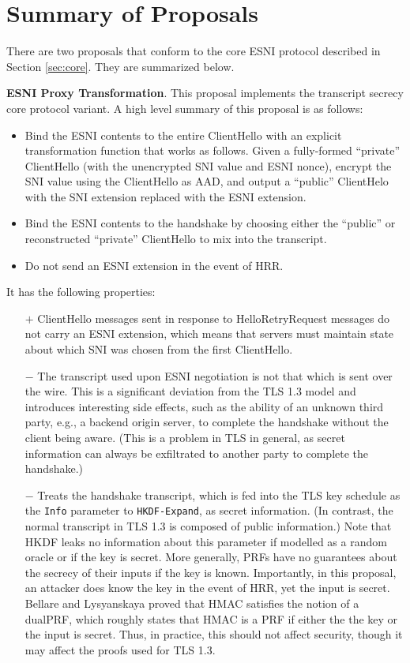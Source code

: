 \documentclass{article}
\theoremstyle{definition}
\theoremstyle{definition}
\begin{document}
\section{Summary of Proposals} \label{sec:proposals}

There are two proposals that conform to the core ESNI protocol described in Section \ref{sec:core}. 
They are summarized below.

\textbf{ESNI Proxy Transformation}. This proposal implements the transcript secrecy core protocol variant. 
A high level summary of this proposal is as follows:
%
\begin{itemize}
  \item Bind the ESNI contents to the entire ClientHello with an explicit transformation function
  that works as follows. Given a fully-formed ``private'' ClientHello (with the unencrypted SNI 
  value and ESNI nonce), encrypt the SNI value using the ClientHello as AAD, and output a ``public'' 
  ClientHelo with the SNI extension replaced with the ESNI extension. 
  \item Bind the ESNI contents to the handshake by choosing either the ``public'' or reconstructed
  ``private'' ClientHello to mix into the transcript. 
  \item Do not send an ESNI extension in the event of HRR.
\end{itemize}
%
It has the following properties:
%
\begin{itemize}
  \item[$+$] ClientHello messages sent in response to HelloRetryRequest messages do not carry an ESNI
  extension, which means that servers must maintain state about which SNI was chosen from the first ClientHello.
  \item[$-$] The transcript used upon ESNI negotiation is not that which is sent over the wire. This is
  a significant deviation from the TLS 1.3 model and introduces interesting side effects, such as the
  ability of an unknown third party, e.g., a backend origin server, to complete the handshake without
  the client being aware. (This is a problem in TLS in general, as secret information can always be
  exfiltrated to another party to complete the handshake.)
  \item[$-$] Treats the handshake transcript, which is fed into the TLS key schedule as the {\tt Info}
  parameter to {\tt HKDF-Expand}, as secret information. (In contrast, the normal transcript in TLS 1.3
  is composed of public information.) Note that HKDF leaks no information about this parameter
  if modelled as a random oracle or if the key is secret. More generally, PRFs have no guarantees about
  the secrecy of their inputs if the key is known. Importantly, in this proposal, an attacker
  does know the key in the event of HRR, yet the input is secret. Bellare and Lysyanskaya \cite{bellare2015symmetric}
  proved that HMAC satisfies the notion of a dualPRF, which roughly states that HMAC is a PRF if 
  either the the key or the input is secret. Thus, in practice, this should not affect security, though
  it may affect the proofs used for TLS 1.3.
\end{itemize}
%
\end{document}
